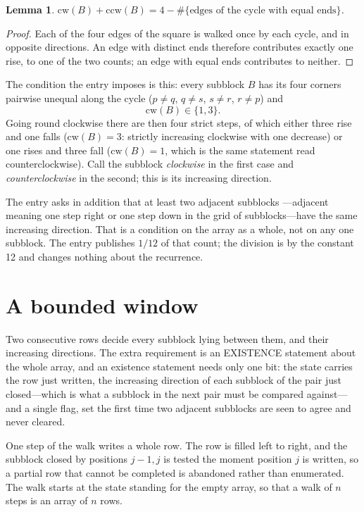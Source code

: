\documentclass[11pt,a4paper]{article}
\theoremstyle{plain}
\newtheorem{lemma}[theorem]{Lemma}
\theoremstyle{definition}
\begin{document}
\begin{lemma}\label{lem:sum}
$\mathrm{cw}(B)+\mathrm{ccw}(B)=4-\#\{\text{edges of the cycle with equal ends}\}$.
\end{lemma}

\begin{proof}
Each of the four edges of the square is walked once by each cycle, and in opposite directions.
An edge with distinct ends therefore contributes exactly one rise, to one of the two counts;
an edge with equal ends contributes to neither.
\end{proof}

The condition the entry imposes is this: every subblock $B$ has its four corners pairwise unequal along the cycle ($p\ne q$, $q\ne s$, $s\ne r$, $r\ne p$) and
\[
\mathrm{cw}(B)\in\{1,3\}.
\]
Going round clockwise there are then four strict steps, of which either three rise and one falls ($\mathrm{cw}(B)=3$: strictly increasing clockwise with one decrease) or one rises and three fall ($\mathrm{cw}(B)=1$, which is the same statement read counterclockwise). Call the subblock \emph{clockwise} in the first case and \emph{counterclockwise} in the second; this is its increasing direction.

The entry asks in addition that at least two adjacent subblocks ---adjacent meaning one step right or one step down in the grid of subblocks---have the same increasing direction. That is a condition on the array as a whole, not on any one subblock. The entry publishes $1/12$ of that count; the division is by the constant 12 and changes nothing about the recurrence.

\section{A bounded window}

Two consecutive rows decide every subblock lying between them, and their increasing directions. The extra requirement is an EXISTENCE statement about the whole array, and an existence statement needs only one bit: the state carries the row just written, the increasing direction of each subblock of the pair just closed---which is what a subblock in the next pair must be compared against---and a single flag, set the first time two adjacent subblocks are seen to agree and never cleared.

One step of the walk writes a whole row. The row is filled left to right, and the subblock
closed by positions $j-1,j$ is tested the moment position $j$ is written, so a partial row that
cannot be completed is abandoned rather than enumerated. The walk starts at the state standing
for the empty array, so that a walk of $n$ steps is an array of $n$ rows.
\end{document}
